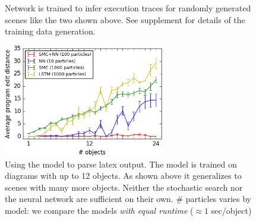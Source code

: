 \documentclass{article}
\begin{document}
\begin{figure}\centering
  \begin{minipage}{6cm}
    \begin{minipage}[t]{2.9cm}\end{minipage}
    \begin{minipage}[t]{2.9cm}\end{minipage}
    \caption{Network is trained to infer execution traces for randomly generated scenes like the two shown above. See supplement for details of the training data generation.}\label{trainingData}
  \end{minipage}\hfill%
  \begin{minipage}{7.5cm}\centering
    \includegraphics[width = 7cm]{figures/editDistanceRecurrent.png}
      \caption{Using the model to parse latex output. The model is trained on diagrams with up to 12 objects. As shown above it generalizes to scenes with many more objects. Neither the stochastic search nor the neural network are sufficient on their own. \# particles varies by model: we compare the models \emph{with equal runtime} ($\approx 1$ sec/object)}\label{syntheticResults}
    \end{minipage}
  
  \end{figure}
\end{document}
